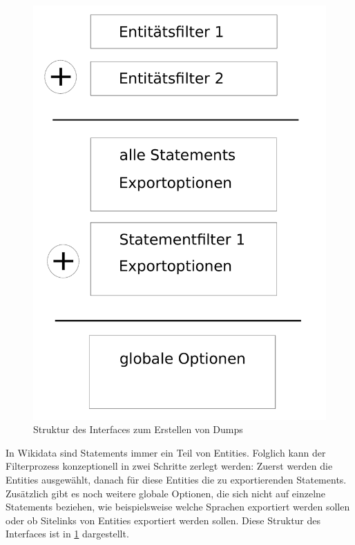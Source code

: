 \begin{figure}
  \includegraphics[width=\textwidth]{pics/ui-layout}
  \caption{Struktur des Interfaces zum Erstellen von Dumps}
  \label{fig:ui-layout}
\end{figure}

In Wikidata sind Statements immer ein Teil von Entities.
Folglich kann der Filterprozess konzeptionell in zwei Schritte zerlegt werden: Zuerst werden die Entities ausgewählt, danach für diese Entities die zu exportierenden Statements.
Zusätzlich gibt es noch weitere globale Optionen, die sich nicht auf einzelne Statements beziehen, wie beispielsweise welche Sprachen exportiert werden sollen oder ob Sitelinks von Entities exportiert werden sollen.
Diese Struktur des Interfaces ist in \cref{fig:ui-layout} dargestellt.


